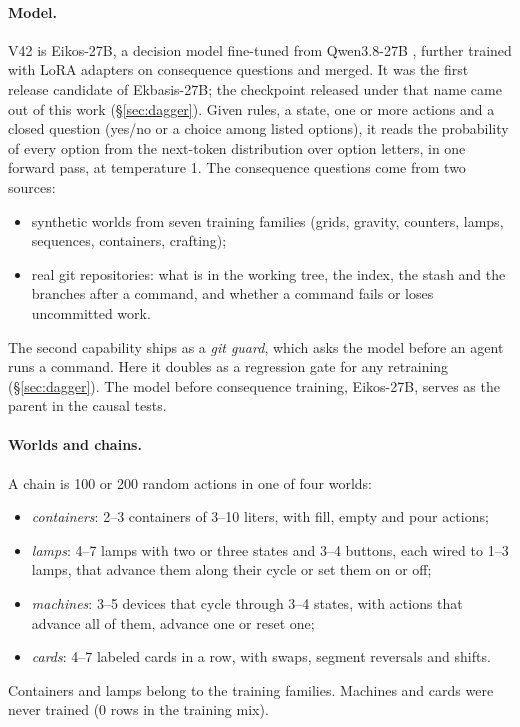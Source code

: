 \documentclass[11pt]{article}
\begin{document}
\paragraph{Model.} V42 is Eikos-27B, a decision model fine-tuned from Qwen3.8-27B \cite{qwen38,eikos}, further trained
with LoRA adapters \cite{hu2022} on consequence questions and merged. It was the first release candidate of
Ekbasis-27B; the checkpoint released under that name came out of this work (\S\ref{sec:dagger}). Given rules, a state, one or more actions
and a closed question (yes/no or a choice among listed options), it reads the probability of every option from the
next-token distribution over option letters, in one forward pass, at temperature 1. The consequence questions come from
two sources:
\begin{itemize}
  \item synthetic worlds from seven training families (grids, gravity, counters, lamps, sequences, containers, crafting);
  \item real git repositories: what is in the working tree, the index, the stash and the branches after a command, and
  whether a command fails or loses uncommitted work.
\end{itemize}
The second capability ships as a \emph{git guard}, which asks the model before an agent runs a command. Here it doubles
as a regression gate for any retraining (\S\ref{sec:dagger}). The model before consequence training, Eikos-27B, serves
as the parent in the causal tests.

\paragraph{Worlds and chains.} A chain is 100 or 200 random actions in one of four worlds:
\begin{itemize}
  \item \emph{containers}: 2--3 containers of 3--10 liters, with fill, empty and pour actions;
  \item \emph{lamps}: 4--7 lamps with two or three states and 3--4 buttons, each wired to 1--3 lamps, that advance
  them along their cycle or set them on or off;
  \item \emph{machines}: 3--5 devices that cycle through 3--4 states, with actions that advance all of them, advance
  one or reset one;
  \item \emph{cards}: 4--7 labeled cards in a row, with swaps, segment reversals and shifts.
\end{itemize}
Containers and lamps belong to the training families. Machines and cards were never trained (0 rows in the training
mix).
\end{document}

